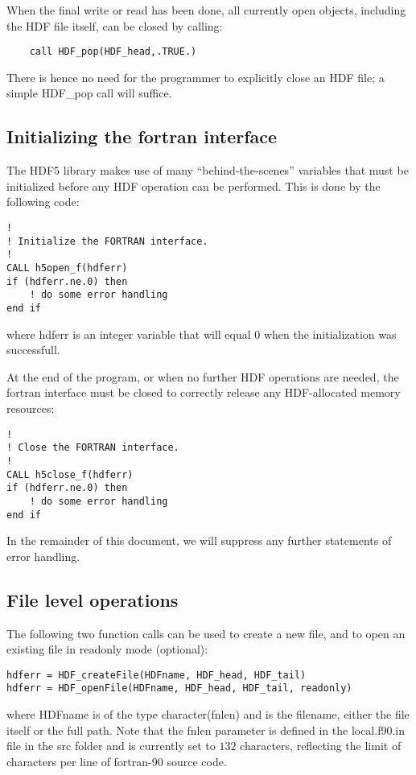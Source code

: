 \documentclass[DIV=calc, paper=letter, fontsize=11pt]{scrartcl}	 %
\begin{document}
When the final write or read has been done, all currently open objects, including the HDF file itself, can
be closed by calling:
\begin{verbatim}
	call HDF_pop(HDF_head,.TRUE.)
\end{verbatim}
There is hence no need for the programmer to explicitly close an HDF file; a simple \textsf{HDF\_pop} call
will suffice.

\subsection{Initializing the fortran interface}
The HDF5 library makes use of many ``behind-the-scenes'' variables that must be initialized before
any HDF operation can be performed. This is done by the following code:
\begin{verbatim}
!
! Initialize the FORTRAN interface.
!
CALL h5open_f(hdferr)
if (hdferr.ne.0) then
    ! do some error handling
end if
\end{verbatim}
where \textsf{hdferr} is an integer variable that will equal $0$ when the initialization was successfull.

At the end of the program, or when no further HDF operations are needed, the fortran interface must be 
closed to correctly release any HDF-allocated memory resources:
\begin{verbatim}
!
! Close the FORTRAN interface.
!
CALL h5close_f(hdferr)
if (hdferr.ne.0) then
    ! do some error handling
end if
\end{verbatim}
In the remainder of this document, we will suppress any further statements of error handling.


\subsection{File level operations}
The following two function calls can be used to create a new file, and to open an existing file in readonly mode (optional):
\begin{verbatim}
hdferr = HDF_createFile(HDFname, HDF_head, HDF_tail)
hdferr = HDF_openFile(HDFname, HDF_head, HDF_tail, readonly)
\end{verbatim}
where \textsf{HDFname} is of the type \textsf{character(fnlen)} and is the filename, either the file itself or the full path.
Note that the \textsf{fnlen} parameter is defined in the \textsf{local.f90.in} file in the \textsf{src} folder and is currently set
to $132$ characters, reflecting the limit of characters per line of fortran-90 source code.
\end{document}
